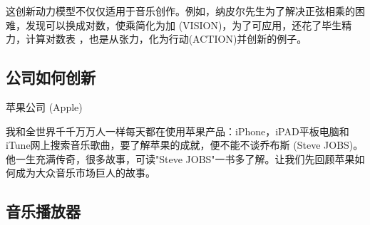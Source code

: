 这创新动力模型不仅仅适用于音乐创作。例如，纳皮尔先生为了解决正弦相乘的困难，发现可以换成对数，使乘简化为加 (VISION)，为了可应用，还花了毕生精力，计算对数表 ，也是从张力，化为行动(ACTION)并创新的例子。



\hypertarget{ux516cux53f8ux5982ux4f55ux521bux65b0}{%
\subsection{公司如何创新}\label{ux516cux53f8ux5982ux4f55ux521bux65b0}}


苹果公司 (Apple)

我和全世界千千万万人一样每天都在使用苹果产品：iPhone，iPAD平板电脑和iTune网上搜索音乐歌曲，要了解苹果的成就，便不能不谈乔布斯
(Steve JOBS)。他一生充满传奇，很多故事，可读"Steve
JOBS"一书多了解。让我们先回顾苹果如何成为大众音乐市场巨人的故事。

\begin{description}
\item[]
\begin{description}
\tightlist
\item[]
= = =
\end{description}
\end{description}

\hypertarget{ux97f3ux4e50ux64adux653eux5668}{%
\subsection{音乐播放器}\label{ux97f3ux4e50ux64adux653eux5668}}


